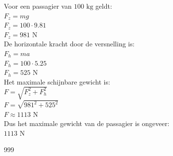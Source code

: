 \documentclass[a4paper]{article}
\begin{document}
\bigskip

Voor een passagier van $100 \text{ kg}$ geldt: \\

$ F_z = mg $ \\

$ F_z = 100 \cdot 9.81 $ \\

$ F_z = 981 \text{ N} $ \\

De horizontale kracht door de versnelling is: \\

$ F_h = ma $ \\

$ F_h = 100 \cdot 5.25 $ \\

$ F_h = 525 \text{ N} $ \\

Het maximale schijnbare gewicht is: \\

$ F = \sqrt{F_z^2 + F_h^2} $ \\

$ F = \sqrt{981^2 + 525^2} $ \\

$ F \approx 1113 \text{ N} $ \\

Dus het maximale gewicht van de passagier is ongeveer: \\

$ \boxed{1113 \text{ N}} $ \\

\begin{thebibliography}{999}
\end{thebibliography}
\end{document}
